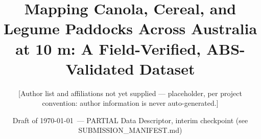 
\title{Mapping Canola, Cereal, and Legume Paddocks Across Australia at 10 m: A Field-Verified, ABS-Validated Dataset}

\author{[Author list and affiliations not yet supplied --- placeholder, per project convention: author information is never auto-generated.]}

\date{Draft of \today\ --- PARTIAL Data Descriptor, interim checkpoint (see SUBMISSION\_MANIFEST.md)}

\newcommand{\keywordlist}{crop-type mapping; Sentinel-2; Segment Anything Model; presence detection; accuracy assessment; gradient boosting; Australia}
